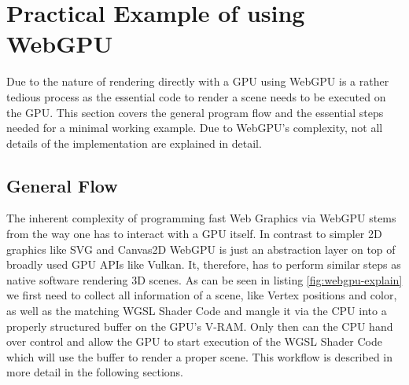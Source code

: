 %
%
% 
% 

\newcommand*{\codesnippet}[4]{
  \inputminted[
    frame=lines,
    framesep=2mm,
    baselinestretch=1.2,
    linenos,
    fontsize=\scriptsize,
    firstline=#1,
    lastline=#2
  ]{#3}{#4}}


\newcommand*{\code}[1]{
  \inputminted[
    frame=lines,
    framesep=2mm,
    baselinestretch=1.2,
    linenos,
    fontsize=\scriptsize,
    breaklines=true,
    highlightlines={30-33,42-49}
  ]{typescript}{#1}}


\chapter{Practical Example of using WebGPU}

\label{chap:PracticalExample}

Due to the nature of rendering directly with a GPU using WebGPU is a rather tedious process as the essential code to render a scene needs to be executed on the GPU.
This section covers the general program flow and the essential steps needed for a minimal working example. Due to WebGPU's complexity, not all details of the implementation are explained in detail. 


\section{General Flow}

The inherent complexity of programming fast Web Graphics via WebGPU stems from the way one has to interact with a GPU itself.
In contrast to simpler 2D graphics like SVG and Canvas2D WebGPU is just an abstraction layer on top of broadly used GPU APIs like Vulkan.
It, therefore, has to perform similar steps as native software rendering 3D scenes. As can be seen in listing \ref*{fig:webgpu-explain} we first need to
collect all information of a scene, like Vertex positions and color, as well as the matching WGSL Shader Code and mangle it via the CPU into a properly structured
buffer on the GPU's V-RAM. Only then can the CPU hand over control and allow the GPU to start execution of the WGSL Shader Code which will use the buffer to render a proper scene.
This workflow is described in more detail in the following sections.


